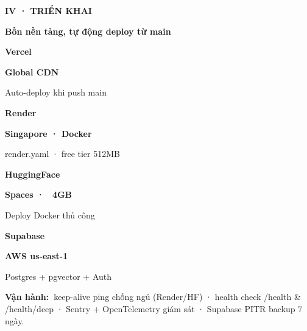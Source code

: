 \documentclass[aspectratio=169,10pt]{beamer}
\newcommand{\kick}[1]{{\headfont\bfseries\footnotesize\textcolor{mred}{\MakeUppercase{#1}}}}
\newcommand{\slidehead}[2]{%
  \kick{#1}\par\vspace{0.6mm}%
  {\headfont\bfseries\LARGE\textcolor{ink}{#2}}\par\vspace{1.2mm}}
\begin{document}
\begin{frame}
\slidehead{IV · Triển khai}{Bốn nền tảng, tự động deploy từ main}
\vspace{0.5mm}\footnotesize
\begin{tcbraster}[raster columns=4, raster equal height=rows, raster column skip=2.5mm]
\begin{tcolorbox}[card,colbacktitle=mred,coltitle=white,title={Frontend}]{\headfont\bfseries\large Vercel}\par{\color{mred}\bfseries Global CDN}\par\vspace{1mm}\textcolor{slate}{Auto-deploy khi push main}\end{tcolorbox}
\begin{tcolorbox}[card,colbacktitle=ink,coltitle=white,title={Backend API}]{\headfont\bfseries\large Render}\par{\color{ink}\bfseries Singapore · Docker}\par\vspace{1mm}\textcolor{slate}{render.yaml · free tier 512MB}\end{tcolorbox}
\begin{tcolorbox}[card,colbacktitle=mgreen,coltitle=white,title={AI Module}]{\headfont\bfseries\large HuggingFace}\par{\color{mgreen}\bfseries Spaces · ~4GB}\par\vspace{1mm}\textcolor{slate}{Deploy Docker thủ công}\end{tcolorbox}
\begin{tcolorbox}[card,colbacktitle=mblue,coltitle=white,title={DB + Storage}]{\headfont\bfseries\large Supabase}\par{\color{mblue}\bfseries AWS us-east-1}\par\vspace{1mm}\textcolor{slate}{Postgres + pgvector + Auth}\end{tcolorbox}
\end{tcbraster}
\vspace{2mm}
\begin{tcolorbox}[creamcard]\small
{\headfont\bfseries\color{mred}Vận hành:\ }keep-alive ping chống ngủ (Render/HF) · health check /health \& /health/deep · Sentry + OpenTelemetry giám sát · Supabase PITR backup 7 ngày.
\end{tcolorbox}
\end{frame}
\end{document}
